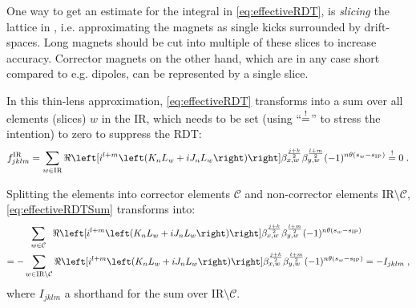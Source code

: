 One way to get an estimate for the integral in \cref{eq:effectiveRDT}, 
is \textit{slicing} the lattice in , 
i.e. approximating the magnets as single kicks surrounded by drift-spaces. 
Long magnets should be cut into multiple of these slices to increase accuracy. 
Corrector magnets on the other hand, which are in any case short compared to e.g. dipoles, 
can  be represented by a single slice.

In this thin-lens approximation, \cref{eq:effectiveRDT} transforms into a sum over all elements (slices) $w$ in the IR, 
which needs to be set (using ``$\overeq{!}$'' to stress the intention) to zero to suppress the RDT:
\begin{equation}
    \label{eq:effectiveRDTSum}
    f^\text{IR}_{jklm} =  \sum\limits_{w \in \text{IR}} 
    \ReOf{    
     i^{l+m}
     \left(K_{n}L_w + iJ_{n}L_w \right) 
    }
        \beta_{x,w}^{\frac{j+k}{2}}
        \beta_{y,w}^{\frac{l+m}{2}} 
     (-1)^{n \theta(s_w - s_\text{IP})} 
     \overeq{!} 0 
     \; .
\end{equation}
%

Splitting the elements into corrector elements $\mathcal{C}$ and non-corrector elements $\text{IR}\setminus\mathcal{C}$,
\cref{eq:effectiveRDTSum} transforms into:
\begin{equation}
    \label{eq:equationSum}
    \begin{split}
    &\;\;\sum\limits_{w \in \mathcal{C}} \;\;
    \ReOf{    
     i^{l+m}
     \left(K_{n}L_w + iJ_{n}L_w \right) 
    }
        \beta_{x,w}^{\frac{j+k}{2}}
        \beta_{y,w}^{\frac{l+m}{2}} 
     (-1)^{n \theta(s_w - s_\text{IP})} \\
     = 
    -&\sum\limits_{w \in \text{IR}\setminus\mathcal{C}} 
    \ReOf{  
     i^{l+m}
     \left(K_{n}L_w + iJ_{n}L_w \right) 
    }
        \beta_{x,w}^{\frac{j+k}{2}}
        \beta_{y,w}^{\frac{l+m}{2}} 
     (-1)^{n \theta(s_w - s_\text{IP})}
     = -I_{jklm}     
     \; ,
    \end{split}
\end{equation}
where $I_{jklm}$ a shorthand for the sum over IR$\setminus\mathcal{C}$.

